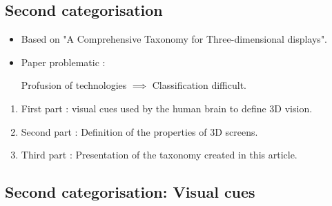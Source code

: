 \subsection{Second categorisation}
\begin{frame}
\begin{itemize}
\item Based on "A Comprehensive Taxonomy for Three-dimensional displays".

\item Paper problematic : 

\begin{center}
Profusion of technologies $\implies$ Classification difficult.
\end{center}

\end{itemize}
\begin{enumerate}
\item First part : visual cues used by the human brain to define 3D vision.
\item Second part : Definition of the properties of 3D screens.
\item Third part : Presentation of the taxonomy created in this article.
\end{enumerate}
\end{frame}

\subsection{Second categorisation: Visual cues}

